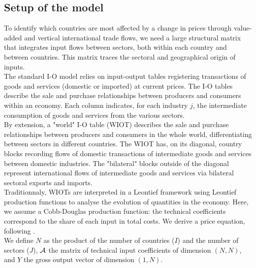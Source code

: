 \documentclass[11pt,a4paper]{paper} %
\begin{document}
\subsection{Setup of the model}\label{subsec:piwimsetup}
To identify which countries are most affected by a change in prices through value-added and vertical international trade flows, we need a large structural matrix that integrates input flows between sectors, both within each country and between countries.
This matrix traces the sectoral and geographical origin of inputs. \\
The standard I-O model relies on input-output tables registering transactions of goods and services (domestic or imported) at current prices. The I-O tables describe the sale and purchase relationships between producers and consumers within an economy. Each column indicates, for each industry $j$, the intermediate consumption of goods and services from the various sectors.\\
By extension, a "world" I-O table (WIOT) describes the sale and purchase relationships between producers and consumers in the whole world, differentiating between sectors in different countries.
The WIOT has, on its diagonal,  country blocks recording flows of domestic transactions of intermediate goods and services between domestic industries.
The "bilateral" blocks outside of the diagonal represent international flows of intermediate goods and services via bilateral sectoral exports and imports. \\
Traditionnaly, WIOTs are interpreted in a Leontief framework using Leontief production functions to analyse the evolution of quantities in the economy. 
Here, we assume a Cobb-Douglas production function: the technical coefficients correspond to the share of each input in total costs. 
We derive a price equation, following \cite{DeSoyres2018}.\\
We define $N$ as the product of the number of countries ($I$) and the number of sectors ($J$), $\cal A$ the matrix of technical input coefficients of dimension $(N, N)$, and $Y$ the gross output vector of dimension $(1, N)$. \\
\end{document}

